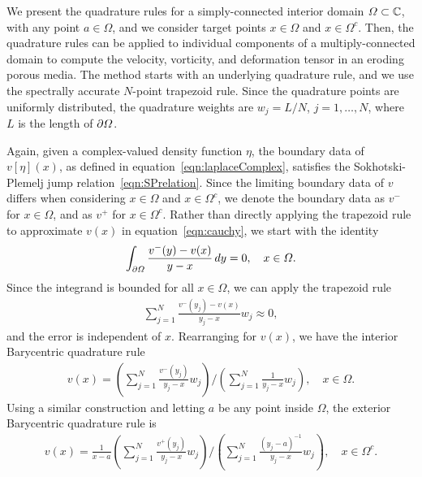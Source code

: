 \documentclass{jfm}
\begin{document}
We present the quadrature rules for a simply-connected interior domain
$\varOmega \subset {\mathbb{C}}$, with any point $a \in \Omega$, and we consider
target points $x \in \Omega$ and $x \in \Omega^c$. Then, the quadrature
rules can be applied to individual components of a multiply-connected
domain to compute the velocity, vorticity, and deformation tensor in an
eroding porous media.  The method starts with an underlying quadrature
rule, and we use the spectrally accurate $N$-point trapezoid rule.
Since the quadrature points are uniformly distributed, the quadrature
weights are $w_j = L/N$, $j=1,\ldots,N$, where $L$ is the length of
${\partial}\varOmega$.

Again, given a complex-valued density function $\eta$, the boundary data
of $v[\eta](x)$, as defined in equation~\eqref{eqn:laplaceComplex},
satisfies the Sokhotski-Plemelj jump relation~\eqref{eqn:SPrelation}.
Since the limiting boundary data of $v$ differs when considering $x \in
\Omega$ and $x \in \Omega^c$, we denote the boundary data as $v^-$ for
$x \in \Omega$, and as $v^+$ for $x \in \Omega^c$.  Rather than directly
applying the trapezoid rule to approximate $v(x)$ in
equation~\eqref{eqn:cauchy}, we start with the identity
\begin{align}
  \int_{{\partial}\varOmega} \frac{v^{-}(y) - v(x)}{y - x} \,dy = 0,
    \quad x \in \varOmega.
\end{align}
Since the integrand is bounded for all $x \in \Omega$, we can apply the
trapezoid rule
\begin{align}
  \sum_{j=1}^{N} \frac{v^{-}(y_j) - v(x)}{y_j - x} w_j \approx 0,
\end{align}
and the error is independent of $x$.  Rearranging for $v(x)$, we have
the interior Barycentric quadrature rule
\begin{align}
  v(x) = \left(\sum_{j=1}^N \frac{v^{-}(y_j)}{y_j - x} w_j \right)
  \Bigg/
  \left(\sum_{j=1}^N \frac{1}{y_j - x} w_j \right), 
  \quad x \in \Omega.
  \label{eqn:BaryvInterior}
\end{align}
Using a similar construction and letting $a$ be any point inside
$\Omega$, the exterior Barycentric quadrature rule is
\begin{align}
  v(x) = \frac{1}{x-a} 
    \left(\sum_{j=1}^N \frac{v^+(y_j)}{y_j - x}w_j \right)
    \Bigg/
    \left(\sum_{j=1}^N \frac{(y_j - a)^{-1}}{y_j - x}w_j \right),
    \quad x \in \Omega^c.
  \label{eqn:BaryvExterior}
\end{align}
\end{document}
